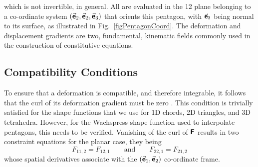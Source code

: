 which is not invertible, in general.  All are evaluated in the 12 plane belonging to a co-ordinate system $( \vec{\boldsymbol{\mathsf{e}}}_2 , \vec{\boldsymbol{\mathsf{e}}}_2 , \vec{\boldsymbol{\mathsf{e}}}_3 )$ that orients this pentagon, with $\vec{\boldsymbol{\mathsf{e}}}_3$ being normal to its surface, as illustrated in Fig.~\ref{figPentagonCoord}.  The deformation and displacement gradients are two, fundamental, kinematic fields commonly used in the construction of constitutive equations.

\subsection{Compatibility Conditions}

To ensure that a deformation is compatible, and therefore integrable, it follows that the curl of its deformation gradient must be zero \cite{Clayton15}.  This condition is trivially satisfied for the shape functions that we use for 1D chords, 2D triangles, and 3D tetrahedra.  However, for the Wachspress shape function used to interpolate pentagons, this needs to be verified.  Vanishing of the curl of $\boldsymbol{\mathsf{F}}$ results in two constraint equations for the planar case, they being
\begin{equation}
\label{compatibility}
F_{11,2} = F_{12,1} 
\qquad \text{and} \qquad
F_{22,1} = F_{21,2}
\end{equation}
whose spatial derivatives associate with the $( \vec{\boldsymbol{\mathsf{e}}}_1 , \vec{\boldsymbol{\mathsf{e}}}_2 )$ co-ordinate frame.

